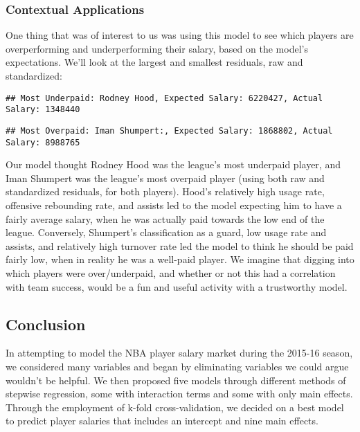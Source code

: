 \documentclass[]{article}
\begin{document}
\subsubsection{Contextual Applications}\label{contextual-applications}

One thing that was of interest to us was using this model to see which
players are overperforming and underperforming their salary, based on
the model's expectations. We'll look at the largest and smallest
residuals, raw and standardized:

\begin{verbatim}
## Most Underpaid: Rodney Hood, Expected Salary: 6220427, Actual Salary: 1348440
\end{verbatim}

\begin{verbatim}
## Most Overpaid: Iman Shumpert:, Expected Salary: 1868802, Actual Salary: 8988765
\end{verbatim}

Our model thought Rodney Hood was the league's most underpaid player,
and Iman Shumpert was the league's most overpaid player (using both raw
and standardized residuals, for both players). Hood's relatively high
usage rate, offensive rebounding rate, and assists led to the model
expecting him to have a fairly average salary, when he was actually paid
towards the low end of the league. Conversely, Shumpert's classification
as a guard, low usage rate and assists, and relatively high turnover
rate led the model to think he should be paid fairly low, when in
reality he was a well-paid player. We imagine that digging into which
players were over/underpaid, and whether or not this had a correlation
with team success, would be a fun and useful activity with a trustworthy
model.

\subsection{Conclusion}\label{conclusion}

In attempting to model the NBA player salary market during the 2015-16
season, we considered many variables and began by eliminating variables
we could argue wouldn't be helpful. We then proposed five models through
different methods of stepwise regression, some with interaction terms
and some with only main effects. Through the employment of k-fold
cross-validation, we decided on a best model to predict player salaries
that includes an intercept and nine main effects.
\end{document}
